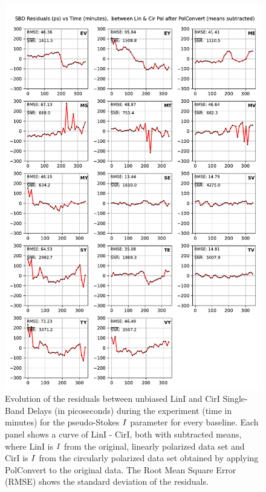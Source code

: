 \documentclass[letterpaper,twoside,12pt]{article}
\begin{document}
\begin{figure}[ht!]
  \begin{center}
  \includegraphics[width=33pc]{SBD_Lin_I_minus_Cir_I.pdf}
  \caption{\small Evolution of the residuals between unbiased LinI and CirI Single-Band Delays (in picoseconds) during the experiment (time in minutes) for the pseudo-Stokes $\protect I$ parameter for every baseline. Each panel shows a curve of LinI - CirI, both with subtracted means, where LinI is $\protect I$ from the original, linearly polarized data set and CirI is $\protect I$ from the circularly polarized data set obtained by applying PolConvert to the original data.  The Root Mean Square Error (RMSE) shows the standard deviation of the residuals.}
  \label{sbd_lin_minus_cir}
  \end{center}
\end{figure}
\end{document}
